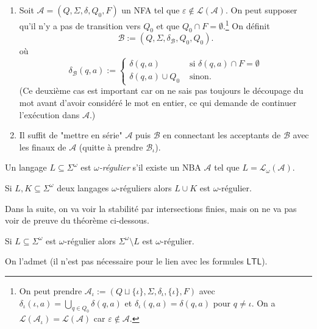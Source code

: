 \documentclass[./main]{subfiles}
\begin{document}
\begin{prv}
\begin{enumerate}
\begin{enumerate}
          \item Soit $\mathcal{A} = (Q, \Sigma, \delta, Q_0, F)$ un NFA tel que $\varepsilon \not\in \mathcal{L}(\mathcal{A})$.
            On peut supposer qu'il n'y a pas de transition vers $Q_0$ et que $Q_0 \cap F = \emptyset$.\footnote{On peut prendre $\mathcal{A}_\iota := (Q \sqcup \{\iota\}, \Sigma, \delta_\iota, \{\iota\}, F)$ avec $\delta_\iota(\iota, a) = \bigcup_{q \in Q_0} \delta(q, a)$ et $\delta_\iota(q, a) = \delta(q, a)$ pour $q \neq \iota$.
              On a $\mathcal{L}(\mathcal{A}_\iota) = \mathcal{L}(\mathcal{A})$ car $\varepsilon \not\in \mathcal{A}$.
            }
            On définit \[
            \mathcal{B} := (Q, \Sigma, \delta_\mathcal{B}, Q_0, Q_0)
            .\] 
            où 
            \[
            \delta_\mathcal{B}(q, a) := \begin{cases}
              \delta(q, a) & \text{ si } \delta(q, a) \cap F = \emptyset \\
              \delta(q, a) \cup Q_0 & \text{ sinon}.
            \end{cases}
            \]
            (Ce deuxième cas est important car on ne sais pas toujours le découpage du mot avant d'avoir considéré le mot en entier, ce qui demande de continuer l'exécution dans $\mathcal{A}$.)
          \item Il suffit de "mettre en série" $\mathcal{A}$ puis  $\mathcal{B}$ en connectant les acceptants de $\mathcal{B}$ avec les finaux de $\mathcal{A}$ (quitte à prendre $\mathcal{B}_\iota$).
        \end{enumerate}
    \end{enumerate}
  \end{prv}

  \begin{defn}
    Un langage $L \subseteq \Sigma^\omega$ est \textit{$\omega$-régulier} s'il existe un NBA $\mathcal{A}$ tel que  $L = \mathcal{L}_\omega(\mathcal{A})$.
  \end{defn}

  \begin{crlr}
    Si $L, K \subseteq \Sigma^\omega$ deux langages $\omega$-réguliers alors $L \cup K$ est $\omega$-régulier.
  \end{crlr}

  Dans la suite, on va voir la stabilité par intersections finies, mais on ne va pas voir de preuve du théorème ci-dessous.

  \begin{thm}[Büchi]
    \label{thm:buchi-compl}
    Si $L \subseteq \Sigma^\omega$ est $\omega$-régulier alors $\Sigma^\omega \setminus L$ est $\omega$-régulier.
  \end{thm}
  \begin{prv}
    On l'admet (il n'est pas nécessaire pour le lien avec les formules $\mathsf{LTL}$).
  \end{prv}
\end{document}
